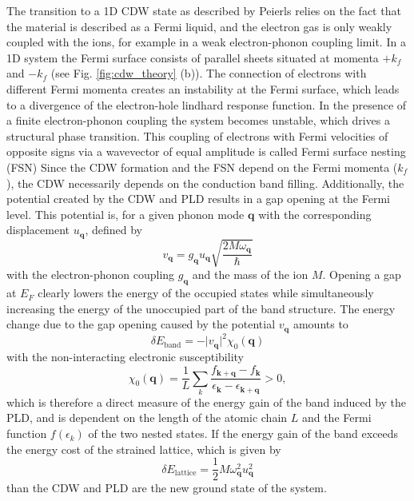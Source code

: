The transition to a 1D CDW state as described by Peierls relies on the fact that the material is described as a Fermi liquid, and the electron gas is only weakly coupled with the ions, for example in a weak electron-phonon coupling limit.
In a 1D system the Fermi surface consists of parallel sheets situated at momenta $+k_f$ and $-k_f$ (see Fig. \ref{fig:cdw_theory} (b)).
The connection of electrons with different Fermi momenta creates an instability at the Fermi surface, which leads to a divergence of the electron-hole lindhard response function.
In the presence of a finite electron-phonon coupling the system becomes unstable, which drives a structural phase transition.
This coupling of electrons with Fermi velocities of opposite signs via a wavevector of equal amplitude is called Fermi surface nesting (FSN)
Since the CDW formation and the FSN depend on the Fermi momenta ($k_f$), the CDW necessarily depends on the conduction band filling.
Additionally, the potential created by the CDW and PLD results in a gap opening at the Fermi level.
This potential is, for a given phonon mode $\mathbf{q}$ with the corresponding displacement $u_\mathbf{q}$, defined by
\begin{equation}
	v_\mathbf{q} = g_\mathbf{q} u_\mathbf{q} \sqrt{\frac{2M\omega_\mathbf{q}}{\hbar}}
\end{equation}
with the electron-phonon coupling $g_\mathbf{q}$ and the mass of the ion $M$.
Opening a gap at $E_F$ clearly lowers the energy of the occupied states while simultaneously increasing the energy of the unoccupied part of the band structure.
The energy change due to the gap opening caused by the potential $v_\mathbf{q}$ amounts to
\begin{equation}
	\delta E_\text{band} = -\lvert v_\mathbf{q}\rvert^2 \chi_0(\mathbf{q})
\end{equation}
with the non-interacting electronic susceptibility
\begin{equation}
	\chi_0(\mathbf{q}) = \frac{1}{L} \sum_{k}^{} \frac{f_{\mathbf{k}+\mathbf{q}}-f_\mathbf{k}}{\epsilon_\mathbf{k}-\epsilon_{\mathbf{k}+\mathbf{q}}}>0 ,
	\label{eq:susz}
\end{equation}
which is therefore a direct measure of the energy gain of the band induced by the PLD, and is dependent on the length of the atomic chain $L$ and the Fermi function $f(\epsilon_k)$ of the two nested states.
If the energy gain of the band exceeds the energy cost of the  strained lattice, which is given by
\begin{equation}
	\delta E_\text{lattice} = \frac{1}{2} M\omega_\mathbf{q}^2 u_\mathbf{q}^2
\end{equation}
than the CDW and PLD are the new ground state of the system.


